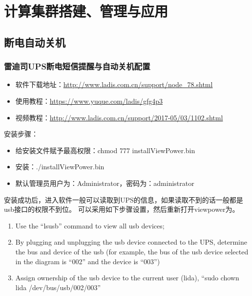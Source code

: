 {%









\part{计算集群搭建、管理与应用}


\chapter{断电自动关机}
\section{雷迪司UPS断电短信提醒与自动关机配置}
\begin{itemize}
\item 软件下载地址：\url{http://www.ladis.com.cn/support/node_78.shtml}

\item 使用教程：\url{https://www.yuque.com/ladis/gfg4p3}

\item 视频教程：\url{http://www.ladis.com.cn/support/2017-05/03/1102.shtml}
\end{itemize}

安装步骤：
\begin{itemize}
\item 给安装文件赋予最高权限：chmod 777 installViewPower.bin

\item 安装：./installViewPower.bin

\item 默认管理员用户为：Administrator，密码为：administrator
\end{itemize}


安装成功后，进入软件一般可以读取到UPS的信息，如果读取不到的话一般都是usb接口的权限不到位。
可以采用如下步骤设置，然后重新打开viewpower为。
\begin{enumerate}
\item Use the  ``lsusb'' command to view all usb devices;
\item By plugging and unplugging the usb device connected to the UPS, determine the bus and device of the usb (for example, the bus of the usb device selected in the diagram is ``002'' and the device is  ``003'')
\item Assign ownership of the usb device to the current user (lida), ``sudo chown lida /dev/bus/usb/002/003''
\end{enumerate}


}
